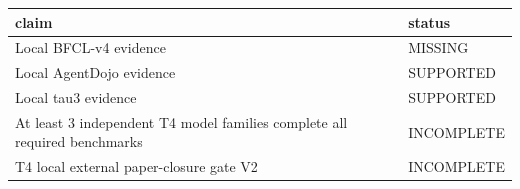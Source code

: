 \begin{tabular}{ll}
\toprule
claim & status \\
\midrule
Local BFCL-v4 evidence & MISSING \\
Local AgentDojo evidence & SUPPORTED \\
Local tau3 evidence & SUPPORTED \\
At least 3 independent T4 model families complete all required benchmarks & INCOMPLETE \\
T4 local external paper-closure gate V2 & INCOMPLETE \\
\bottomrule
\end{tabular}
